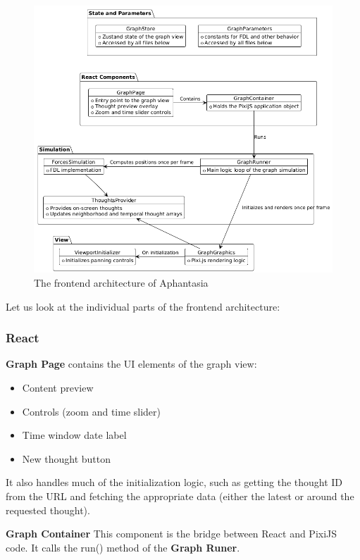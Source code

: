 \begin{figure}[p]\centering
    \includegraphics[width=140mm, keepaspectratio]{img/afantazie_frontend_architecture.png}
    \caption{The frontend architecture of Aphantasia}
    \label{obr:afantazie_frontend_architecture}
\end{figure}

Let us look at the individual parts of the frontend architecture:
\subsubsection*{React}
\textbf{Graph Page} contains the UI elements of the graph view:
\begin{itemize}
    \item Content preview
    \item Controls (zoom and time slider)
    \item Time window date label
    \item New thought button
\end{itemize}
It also handles much of the initialization logic, such as getting the thought ID from the URL and fetching the appropriate data
(either the latest or around the requested thought).

\textbf{Graph Container}
This component is the bridge between React and PixiJS code. It calls the run() method of the \textbf{Graph Runer}.

